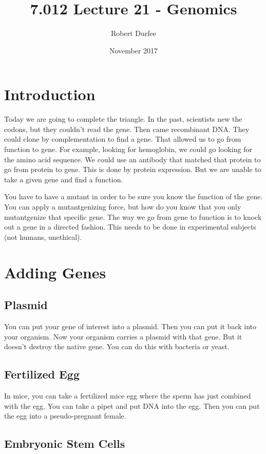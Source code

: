 \documentclass{article}
\title{7.012 Lecture 21 - Genomics}
\author{Robert Durfee}
\date{November 2017}
\begin{document}
\maketitle

\section{Introduction}

Today we are going to complete the triangle. In the past, scientists new the codons, but they couldn't read the gene. Then came recombinant DNA. They could clone by complementation to find a gene. That allowed us to go from function to gene. For example, looking for hemoglobin, we could go looking for the amino acid sequence. We could use an antibody that matched that protein to go from protein to gene. This is done by protein expression. But we are unable to take a given gene and find a function.

You have to have a mutant in order to be sure you know the function of the gene. You can apply a mutantgenizing force, but how do you know that you only mutantgenize that specific gene. The way we go from gene to function is to knock out a gene in a directed fashion. This needs to be done in experimental subjects (not humans, unethical).

\section{Adding Genes}

\subsection{Plasmid}

You can put your gene of interest into a plasmid. Then you can put it back into your organism. Now your organism carries a plasmid with that gene. But it doesn't destroy the native gene. You can do this with bacteria or yeast.

\subsection{Fertilized Egg}

In mice, you can take a fertilized mice egg where the sperm has just combined with the egg. You can take a pipet and put DNA into the egg. Then you can put the egg into a pseudo-pregnant female.

\subsection{Embryonic Stem Cells}
\end{document}
